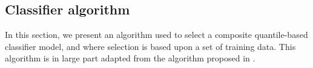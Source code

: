

\subsection{Classifier algorithm}
\label{sec:classifier-algorithm}

In this section, we present an algorithm used to select a composite
quantile-based classifier model, and where selection is based upon a set of
training data.  This algorithm is in large part adapted from the algorithm
proposed in \cite{fan2016}.

